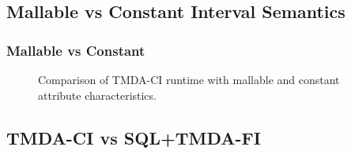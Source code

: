 \documentclass[]{beamer}
\begin{document}
\subsection{Mallable vs Constant Interval Semantics}
\begin{frame}
\frametitle{Mallable vs Constant}
\begin{figure}[ht!]
	\begin{center}
	\end{center}
	\caption{Comparison of TMDA-CI runtime with mallable and constant attribute characteristics.}
	\label{mal_vs_const}
\end{figure} 
\end{frame}

\subsection{TMDA-CI vs SQL+TMDA-FI}
\end{document}
